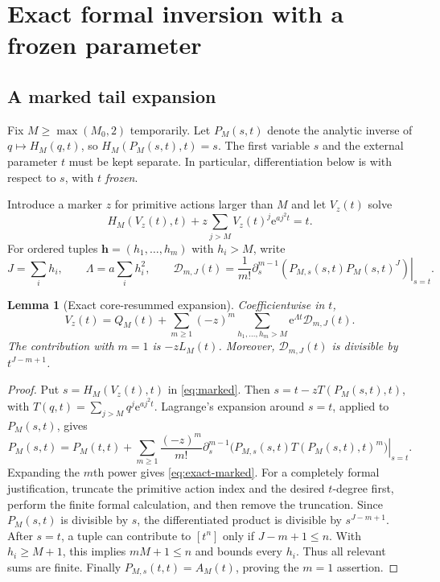\documentclass[11pt,a4paper]{article}
\numberwithin{equation}{section}
\newtheorem{lemma}[theorem]{Lemma}
\theoremstyle{definition}
\theoremstyle{remark}\newtheorem{remark}[theorem]{Remark}
\newcommand{\ee}{\mathrm e}\newcommand{\dd}{\mathrm d}
\begin{document}
\section{Exact formal inversion with a frozen parameter}
\label{sec:formal}

\subsection{A marked tail expansion}
Fix $M\ge\max(M_0,2)$ temporarily. Let $P_M(s,t)$ denote the analytic inverse
of $q\mapsto H_M(q,t)$, so $H_M(P_M(s,t),t)=s$.
The first variable $s$ and the external parameter $t$ must be kept separate.
In particular, differentiation below is with respect to $s$, with $t$
\emph{frozen}.

Introduce a marker $z$ for primitive actions larger than $M$ and let $V_z(t)$
solve
\begin{equation}
 H_M(V_z(t),t)+z\sum_{j>M}V_z(t)^j\ee^{aj^2t}=t.
 \label{eq:marked}
\end{equation}
For ordered tuples $\boldsymbol{h}=(h_1,\ldots,h_m)$ with $h_i>M$, write
\begin{equation}
 J=\sum_i h_i,\qquad
 \Lambda=a\sum_i h_i^2,\qquad
 \mathcal D_{m,J}(t)=\frac1{m!}
 \left.\partial_s^{m-1}\!\left(P_{M,s}(s,t)P_M(s,t)^J\right)\right|_{s=t}.
 \label{eq:Dmj}
\end{equation}

\begin{lemma}[Exact core-resummed expansion]
\label{lem:formal}
Coefficientwise in $t$,
\begin{equation}
 V_z(t)=Q_M(t)+
 \sum_{m\ge1}(-z)^m
 \sum_{h_1,\ldots,h_m>M}\ee^{\Lambda t}\mathcal D_{m,J}(t).
 \label{eq:exact-marked}
\end{equation}
The contribution with $m=1$ is $-zL_M(t)$.
Moreover, $\mathcal D_{m,J}(t)$ is divisible by $t^{J-m+1}$.
\end{lemma}
\begin{proof}
Put $s=H_M(V_z(t),t)$ in \eqref{eq:marked}. Then
$s=t-zT(P_M(s,t),t)$, with $T(q,t)=\sum_{j>M}q^j\ee^{aj^2t}$.
Lagrange's expansion around $s=t$, applied to $P_M(s,t)$, gives
\[
 P_M(s,t)=P_M(t,t)+
 \sum_{m\ge1}\frac{(-z)^m}{m!}
 \left.\partial_s^{m-1}\bigl(P_{M,s}(s,t)T(P_M(s,t),t)^m\bigr)\right|_{s=t}.
\]
Expanding the $m$th power gives \eqref{eq:exact-marked}.
For a completely formal justification, truncate the primitive action index
and the desired $t$-degree first, perform the finite formal calculation,
and then remove the truncation. Since $P_M(s,t)$ is divisible by $s$,
the differentiated product is divisible by $s^{J-m+1}$.
After $s=t$, a tuple can contribute to $[t^n]$ only if
$J-m+1\le n$. With $h_i\ge M+1$, this implies $mM+1\le n$ and bounds
every $h_i$. Thus all relevant sums are finite. Finally
$P_{M,s}(t,t)=A_M(t)$, proving the $m=1$ assertion.
\end{proof}
\end{document}
